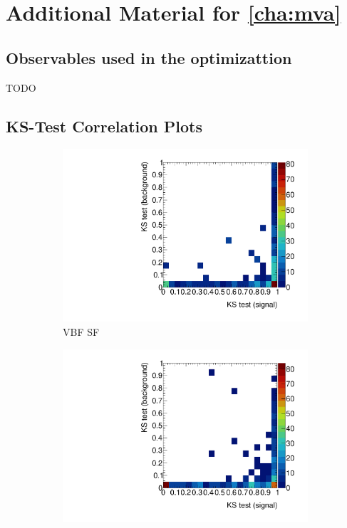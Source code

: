 \chapter{Additional Material for \cref*{cha:mva}}\label{cha:appendix_mva}

\section{Observables used in the optimizattion}\label{app:mva:fulllistvars}

TODO

\section{KS-Test Correlation Plots}

\begin{figure}[htb]
    \centering
    \begin{subfigure}[t]{0.45\textwidth}
        \includegraphics[width=\textwidth]{./plots/mva/scan/VBF_SF_ks_test_sig_vs_bkg.pdf}
        \caption{VBF SF}
    \end{subfigure}
    \begin{subfigure}[t]{0.45\textwidth}
        \includegraphics[width=\textwidth]{./plots/mva/scan/VBF_DF_ks_test_sig_vs_bkg.pdf}

\end{subfigure}
\end{figure}
